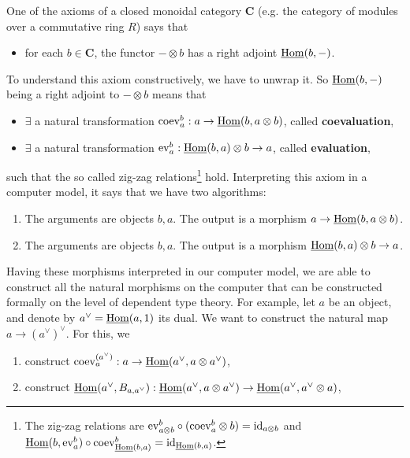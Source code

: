 \begin{example}
 One of the axioms of a closed monoidal category $\mathbf{C}$ (e.g. the category of modules over a commutative ring $R$)
 says that
 \begin{itemize}
  \item for each $b \in \mathbf{C}$, the functor $- \otimes b$ has a right adjoint $\underline{\operatorname{\mathrm{Hom}}}(b,-)$.
 \end{itemize}
 To understand this axiom constructively, we have to unwrap it.
 So $\underline{\operatorname{\mathrm{Hom}}}(b,-)$ being a right adjoint to $- \otimes b$ means that
 \begin{itemize}
  \item $\exists$ a natural transformation $\mathrm{coev}^b_a: a \rightarrow \underline{\operatorname{\mathrm{Hom}}}(b, a \otimes b)$, called \textbf{coevaluation},
  \item $\exists$ a natural transformation $\mathrm{ev}^b_a: \underline{\operatorname{\mathrm{Hom}}}(b,a) \otimes b \rightarrow a$, called \textbf{evaluation},
 \end{itemize}
 such that the so called zig-zag relations\footnote{The zig-zag relations are $\mathrm{ev}^b_{a \otimes b} \circ (\mathrm{coev}^b_a \otimes b) = \mathrm{id}_{a \otimes b}$ and
  $\underline{\operatorname{\mathrm{Hom}}}(b,\mathrm{ev}^b_a) \circ \mathrm{coev}^b_{\underline{\operatorname{\mathrm{Hom}}}(b,a)} = \mathrm{id}_{\underline{\operatorname{\mathrm{Hom}}}(b,a)}$.} hold.
 Interpreting this axiom in a computer model,
 it says that we have two algorithms:
 \begin{enumerate}
  \item The arguments are objects $b,a$. The output is a morphism $a \rightarrow \underline{\operatorname{\mathrm{Hom}}}(b, a \otimes b)$.
  \item The arguments are objects $b,a$. The output is a morphism $\underline{\operatorname{\mathrm{Hom}}}(b,a) \otimes b \rightarrow a$.
 \end{enumerate}
 Having these morphisms interpreted in our computer model, we are able to construct all the natural
 morphisms on the computer that can be constructed formally on the level of dependent type theory.
 For example, let $a$ be an object, and denote by $a^{\vee} = \underline{\operatorname{\mathrm{Hom}}}(a,1)$ its dual.
 We want to construct the natural map $a \rightarrow (a^{\vee})^{\vee}$. For this, we
 \begin{enumerate}
  \item construct $\mathrm{coev}^{(a^{\vee})}_a: a \rightarrow \underline{\operatorname{\mathrm{Hom}}}(a^{\vee}, a \otimes a^{\vee})$,
  \item construct $\underline{\operatorname{\mathrm{Hom}}}(a^{\vee}, B_{a, a^{\vee}}): \underline{\operatorname{\mathrm{Hom}}}(a^{\vee}, a \otimes a^{\vee}) \rightarrow \underline{\operatorname{\mathrm{Hom}}}(a^{\vee}, a^{\vee} \otimes a)$,

\end{enumerate}
\end{example}
